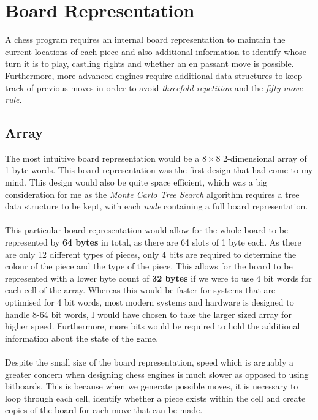 \chapter{Board Representation}
A chess program requires an internal board representation to maintain the current locations of each piece and also additional information to identify whose turn it is to play, castling rights and whether an en passant move is possible. Furthermore, more advanced engines require additional data structures to keep track of previous moves in order to avoid \textit{threefold repetition} and the \textit{fifty-move rule}.
\section{Array}
The most intuitive board representation would be a $8 \times 8$ 2-dimensional array of 1 byte words. This board representation was the first design that had come to my mind. This design would also be quite space efficient, which was a big consideration for me as the \textit{Monte Carlo Tree Search} algorithm requires a tree data structure to be kept, with each \textit{node} containing a full board representation.\\\\
This particular board representation would allow for the whole board to be represented by \textbf{64 bytes} in total, as there are 64 slots of 1 byte each. As there are only 12 different types of pieces, only 4 bits are required to determine the colour of the piece and the type of the piece. This allows for the board to be represented with a lower byte count of \textbf{32 bytes} if we were to use 4 bit words for each cell of the array. Whereas this would be faster for systems that are optimised for 4 bit words, most modern systems and hardware is designed to handle 8-64 bit words, I would have chosen to take the larger sized array for higher speed. Furthermore, more bits would be required to hold the additional information about the state of the game.\\\\
Despite the small size of the board representation, speed which is arguably a greater concern when designing chess engines is much slower as opposed to using bitboards. This is because when we generate possible moves, it is necessary to loop through each cell, identify whether a piece exists within the cell and create copies of the board for each move that can be made.

